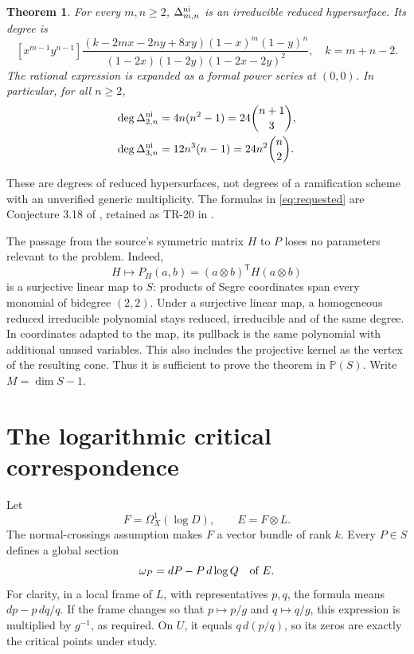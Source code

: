 \documentclass[11pt]{article}
\newtheorem{theorem}{Theorem}
\newcommand{\PP}{\mathbb P}
\begin{document}
\begin{theorem}\label{thm:general}
For every $m,n\ge2$, $\Delta^{\rm ni}_{m,n}$ is an irreducible reduced
hypersurface. Its degree is
\begin{equation}\label{eq:general}
\boxed{
 [x^{m-1}y^{n-1}]
 \frac{(k-2mx-2ny+8xy)(1-x)^m(1-y)^n}
 {(1-2x)(1-2y)(1-2x-2y)^2},\quad k=m+n-2.
}
\end{equation}
The rational expression is expanded as a formal power series at $(0,0)$.
In particular, for all $n\ge2$,
\begin{equation}\label{eq:requested}
 \begin{split}
 \deg\Delta^{\rm ni}_{2,n}&=4n(n^2-1)=24\binom{n+1}{3},\\
 \deg\Delta^{\rm ni}_{3,n}&=12n^3(n-1)=24n^2\binom n2.
 \end{split}
\end{equation}
\end{theorem}

These are degrees of reduced hypersurfaces, not degrees of a
ramification scheme with an unverified generic multiplicity. The
formulas in \eqref{eq:requested} are Conjecture 3.18 of
\cite{BFHP}, retained as TR-20 in \cite{repo}.

The passage from the source's symmetric matrix $H$ to $P$ loses no
parameters relevant to the problem. Indeed,
\[
 H\longmapsto P_H(a,b)=(a\otimes b)^{\mathsf T}H(a\otimes b)
\]
is a surjective linear map to $S$: products of Segre coordinates
span every monomial of bidegree $(2,2)$. Under a surjective linear
map, a homogeneous reduced irreducible polynomial stays reduced,
irreducible and of the same degree. In coordinates adapted to the
map, its pullback is the same polynomial with additional unused
variables. This also includes the projective kernel as the vertex
of the resulting cone. Thus it is sufficient to prove the theorem
in $\PP(S)$. Write $M=\dim S-1$.

\section{The logarithmic critical correspondence}
Let
\[
 F=\Omega_X^1(\log D),\qquad E=F\otimes L.
\]
The normal-crossings assumption makes $F$ a vector bundle of rank $k$.
Every $P\in S$ defines a global section
\begin{equation}\label{eq:omega}
 \omega_P=dP-P\,d\log Q\quad\hbox{of }E.
\end{equation}
For clarity, in a local frame of $L$, with representatives $p,q$, the
formula means $dp-p\,dq/q$. If the frame changes so that
$p\mapsto p/g$ and $q\mapsto q/g$, this expression is multiplied by
$g^{-1}$, as required. On $U$, it equals $q\,d(p/q)$, so its zeros
are exactly the critical points under study.
\end{document}
